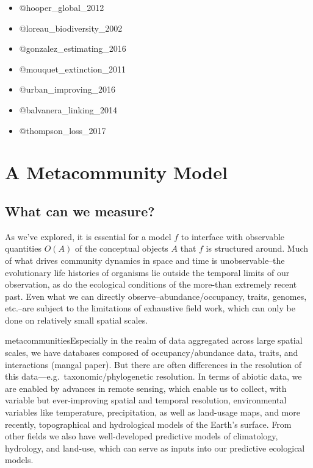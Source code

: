 \begin{itemize}
\tightlist
\item
  @hooper\_global\_2012
\item
  @loreau\_biodiversity\_2002
\item
  @gonzalez\_estimating\_2016
\item
  @mouquet\_extinction\_2011
\item
  @urban\_improving\_2016
\item
  @balvanera\_linking\_2014
\item
  @thompson\_loss\_2017
\end{itemize}

\hypertarget{a-metacommunity-model}{%
\section{A Metacommunity Model}\label{a-metacommunity-model}}

\hypertarget{what-can-we-measure}{%
\subsection{What can we measure?}\label{what-can-we-measure}}

As we've explored, it is essential for a model \(f\) to interface with
observable quantities \(O(A)\) of the conceptual objects \(A\) that
\(f\) is structured around. Much of what drives community dynamics in
space and time is unobservable--the evolutionary life histories of
organisms lie outside the temporal limits of our observation, as do the
ecological conditions of the more-than extremely recent past. Even what
we can directly observe--abundance/occupancy, traits, genomes, etc.--are
subject to the limitations of exhaustive field work, which can only be
done on relatively small spatial scales.

metacommunitiesEspecially in the realm of data aggregated across large
spatial scales, we have databases composed of occupancy/abundance data,
traits, and interactions (mangal paper). But there are often differences
in the resolution of this data---e.g.~taxonomic/phylogenetic resolution.
In terms of abiotic data, we are enabled by advances in remote sensing,
which enable us to collect, with variable but ever-improving spatial and
temporal resolution, environmental variables like temperature,
precipitation, as well as land-usage maps, and more recently,
topographical and hydrological models of the Earth's surface. From other
fields we also have well-developed predictive models of climatology,
hydrology, and land-use, which can serve as inputs into our predictive
ecological models.

